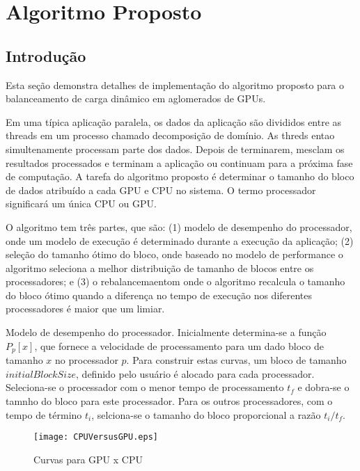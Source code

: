 \pagestyle{empty}
\cleardoublepage
\pagestyle{fancy}

\chapter{Algoritmo Proposto}\label{cap4}

\section{Introdução}\label{cap4:intro}

Esta seção demonstra detalhes de implementação do algoritmo proposto para o balanceamento de carga dinâmico em aglomerados de GPUs. 

Em uma típica aplicação paralela, os dados da aplicação são divididos entre as threads em um processo chamado decomposição de domínio. As threds entao simultenamente processam parte dos dados. Depois de terminarem, mesclam os resultados processados e terminam a aplicação ou continuam para a próxima fase de computação. A tarefa do algoritmo proposto é determinar o tamanho do bloco de dados atribuído a cada GPU e CPU no sistema. O termo processador significará um única CPU ou GPU.

O algoritmo tem três partes, que são: (1) modelo de desempenho do processador, onde um modelo de execução é determinado durante a execução da aplicação; (2) seleção do tamanho ótimo do bloco, onde baseado no modelo de performance o algoritmo seleciona a melhor distribuição de tamanho de blocos entre os processadores; e (3) o rebalancemaentom onde o algoritmo recalcula o tamanho do bloco ótimo quando a diferença no tempo de execução nos diferentes processadores é maior que um limiar.

Modelo de desempenho do processador. Inicialmente determina-se a função $P_p[x]$, que fornece a velocidade de processamento para um dado bloco de tamanho $x$ no processador $p$. Para construir estas curvas, um bloco de tamanho $initialBlockSize$, definido pelo usuário é alocado para cada processador. Seleciona-se o processador com o menor tempo de processamento $t_f$ e dobra-se o tamnho do bloco para este processador. Para os outros processadores, com o tempo de término $t_i$, selciona-se o tamanho do bloco proporcional a razão $t_i/t_f$.


\begin{figure*}[htb]
	\begin{center}
	\centering
			\texttt{[image: CPUVersusGPU.eps]}
	\caption{Curvas para GPU x CPU}
	\label{fig:CPUVersusGPU}
	\end{center}
\end{figure*}


